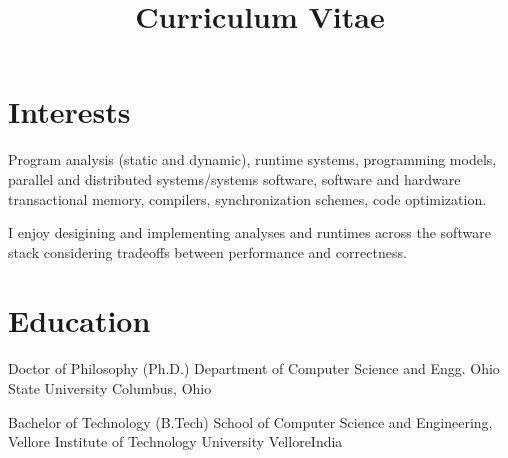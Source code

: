 \documentclass[10pt,a4paper,roman]{moderncv}
\title{Curriculum Vitae}
\begin{document}
\maketitle


\section{Interests}
\cvline{}
{Program analysis (static and dynamic), runtime systems, programming models, parallel and distributed systems/systems software, software and hardware transactional memory, compilers, synchronization schemes, code optimization.}

\cvline{}
{I enjoy desigining and implementing analyses and runtimes across the software stack considering tradeoffs between performance and correctness.}

\section{Education}
{Doctor of Philosophy (Ph.D.)}
{Department of Computer Science and Engg.}
{Ohio State University}
{Columbus, Ohio}
{}
\cvline{}{}


{Bachelor of Technology (B.Tech)}
{School of Computer Science and Engineering, Vellore Institute of Technology University}
{Vellore}{India}
{}
\cvline{}{}
\nocite{*}

\end{document}
